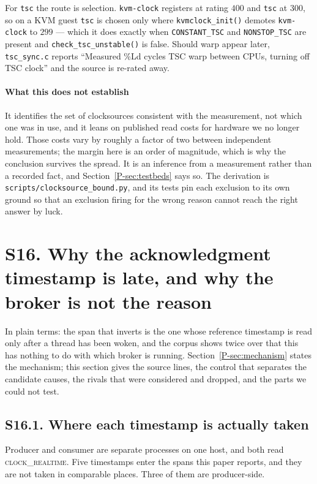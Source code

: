 \documentclass[10pt,journal,onecolumn]{IEEEtran}
\newcommand{\mainTestbeds}{\ref{P-sec:testbeds}}        %
\newcommand{\mainModeA}{\ref{P-sec:mechanism}}             %
\begin{document}
For \texttt{tsc} the route is selection. \texttt{kvm-clock} registers at rating $400$ and
\texttt{tsc} at $300$, so on a KVM guest \texttt{tsc} is chosen only where
\texttt{kvmclock\_init()} demotes \texttt{kvm-clock} to $299$ --- which it does exactly when
\texttt{CONSTANT\_TSC} and \texttt{NONSTOP\_TSC} are present and \texttt{check\_tsc\_unstable()}
is false. Should warp appear later, \texttt{tsc\_sync.c} reports ``Measured \%Ld cycles TSC
warp between CPUs, turning off TSC clock'' and the source is re-rated away.

\paragraph{What this does not establish}
It identifies the set of clocksources consistent with the measurement, not which one was in
use, and it leans on published read costs for hardware we no longer hold. Those costs vary by
roughly a factor of two between independent measurements; the margin here is an order of
magnitude, which is why the conclusion survives the spread. It is an inference from a
measurement rather than a recorded fact, and Section~\mainTestbeds{} says so. The derivation is
\texttt{scripts/clocksource\_bound.py}, and its tests pin each exclusion to its own ground so
that an exclusion firing for the wrong reason cannot reach the right answer by luck.

\section{S16. Why the acknowledgment timestamp is late, and why the broker is not the reason}

In plain terms: the span that inverts is the one whose reference timestamp is read only after a
thread has been woken, and the corpus shows twice over that this has nothing to do with which
broker is running. Section~\mainModeA{} states the mechanism; this section gives the source lines, the
control that separates the candidate causes, the rivals that were considered and dropped, and
the parts we could not test.

\subsection{S16.1. Where each timestamp is actually taken}

Producer and consumer are separate processes on one host, and both read
\textsc{clock\_realtime}. Five timestamps enter the spans this paper reports, and they are not
taken in comparable places. Three of them are producer-side.
\end{document}
